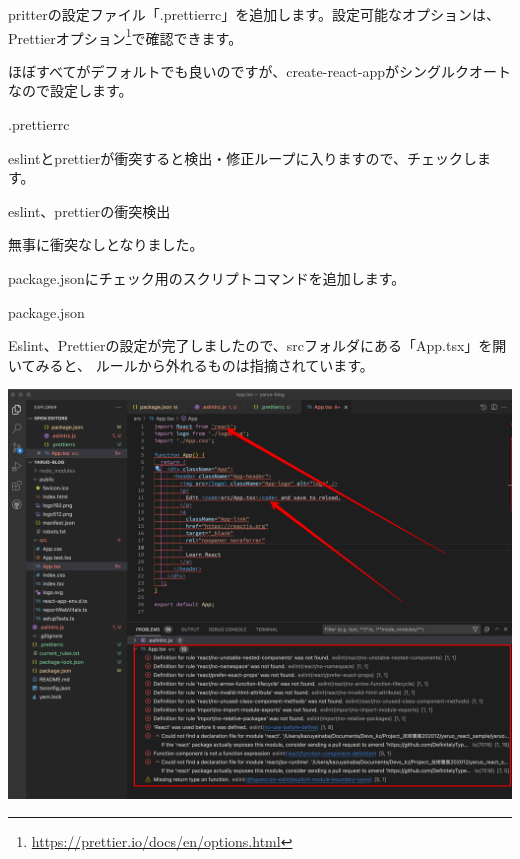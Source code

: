 pritterの設定ファイル「.prettierrc」を追加します。設定可能なオプションは、
Prettierオプション\footnote{\url{https://prettier.io/docs/en/options.html}}で確認できます。

ほぼすべてがデフォルトでも良いのですが、create{-}react{-}appがシングルクオートなので設定します。

\def\startercodeblockfontsize{}
\begin{starterprogram}[]{.prettierrc}\end{starterprogram}

eslintとprettierが衝突すると検出・修正ループに入りますので、チェックします。

\def\startercodeblockfontsize{}
\begin{starterterminal}[]{eslint、prettierの衝突検出}\end{starterterminal}

無事に衝突なしとなりました。

package.jsonにチェック用のスクリプトコマンドを追加します。

\def\startercodeblockfontsize{}
\begin{starterprogram}[]{package.json}\end{starterprogram}

Eslint、Prettierの設定が完了しましたので、srcフォルダにある「App.tsx」を開いてみると、
ルールから外れるものは指摘されています。

\begin{reviewimage}[H]%
\includegraphics[width=1.0\maxwidth]{./images/02-create-react-app/03_eslint_prettier.png}%
\label{image:02-create-react-app:03_eslint_prettier}
\end{reviewimage}

